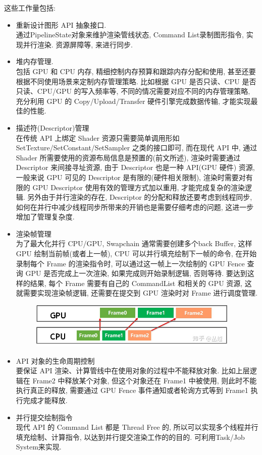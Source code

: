 \documentclass[UTF8]{ctexart}
\begin{document}
这些工作量包括:
\begin{itemize}
\item 重新设计图形 API 抽象接口.
  \\通过PipelineState对象来维护渲染管线状态, Command List录制图形指令, 实现并行渲染. 资源屏障等, 来进行同步.

\item 堆内存管理.
  \\包括 GPU 和 CPU 内存, 精细控制内存预算和跟踪内存分配和使用, 甚至还要根据不同使用场景来定制内存管理策略. 比如根据 GPU 是否只读、CPU 是否只读、CPU/GPU 的写入频率等, 不同的情况需要对应不同的内存管理策略, 充分利用 GPU 的 Copy/Upload/Transfer 硬件引擎完成数据传输, 才能实现最佳的性能.

\item 描述符(Descriptor)管理
  \\在传统 API 上绑定 Shader 资源只需要简单调用形如 SetTexture/SetConstant/SetSampler 之类的接口即可, 而在现代 API 中, 通过 Shader 所需要使用的资源布局信息是预置的(前文所述), 渲染时需要通过 Descriptor 来间接寻址资源, 由于 Descriptor 也是一种 API(GPU 硬件) 资源, 一般来说 GPU 可见的 Descriptor 是有限的(硬件相关限制), 渲染时需要对有限的 GPU Descriptor 使用有效的管理方式加以重用, 才能完成复杂的渲染逻辑. 另外由于并行渲染的存在, Descriptor 的分配和释放还要考虑到线程同步, 如何在并行中减少线程同步所带来的开销也是需要仔细考虑的问题, 这进一步增加了管理复杂度.

\item 渲染帧管理
  \\为了最大化并行 CPU/GPU, Swapchain 通常需要创建多个back Buffer, 这样 GPU 绘制当前帧(或者上一帧), CPU 可以并行填充绘制下一帧的命令, 在开始录制每个 Frame 的渲染指令时, 可以通过这一帧上一次绘制的 GPU Fence 查询 GPU 是否完成上一次渲染, 如果完成则开始录制逻辑, 否则等待. 要达到这样的结果, 每个 Frame 需要有自己的 CommandList 和相关的 GPU 资源, 这就需要实现渲染帧逻辑, 还需要在提交到 GPU 渲染时对 Frame 进行调度管理.
  \begin{figure}[h]
    \includegraphics[width=10cm]{frame_management.jpg}
    \centering
  \end{figure}

\item API 对象的生命周期控制
  \\要保证 API 渲染、计算管线中在使用对象的过程中不能释放对象. 比如上层逻辑在 Frame2 中释放某个对象, 但这个对象还在 Frame1 中被使用, 则此时不能执行真正的释放, 需要通过 GPU Fence 事件通知或者轮询方式等到 Frame1 执行完成才能释放.

\item 并行提交绘制指令
  \\现代 API 的 Command List 都是 Thread Free 的, 所以可以实现多个线程并行填充绘制、计算指令, 以达到并行提交渲染工作的的目的. 可利用Task/Job System来实现.
\end{itemize}
\end{document}
